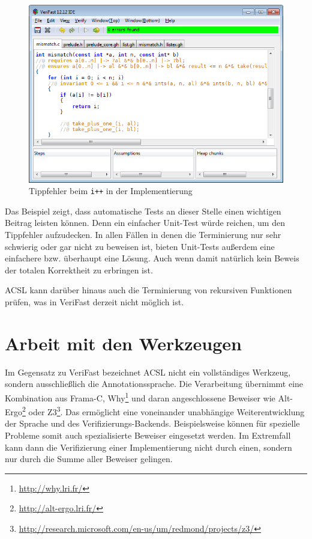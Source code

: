 {\begin{figure}[H]
	\centering
\includegraphics[width=1.0\textwidth]{images/VeriFast-partial-correctness.png}
\caption{Tippfehler beim \texttt{i++} in der Implementierung}
\end{figure}

Das Beispiel zeigt, dass automatische Tests an dieser Stelle einen wichtigen Beitrag leisten
können. Denn ein einfacher Unit-Test würde reichen, um den Tippfehler aufzudecken. In allen
Fällen in denen die Terminierung nur sehr schwierig oder gar nicht zu beweisen ist, bieten
Unit-Tests außerdem eine einfachere bzw. überhaupt eine Lösung. Auch wenn damit natürlich
kein Beweis der totalen Korrektheit zu erbringen ist.

ACSL kann darüber hinaus auch die Terminierung von rekursiven Funktionen prüfen, was in
VeriFast derzeit nicht möglich ist.


\section{Arbeit mit den Werkzeugen}
Im Gegensatz zu VeriFast bezeichnet ACSL nicht ein vollständiges Werkzeug, sondern ausschließlich
die Annotationssprache. Die Verarbeitung übernimmt eine Kombination aus Frama-C, Why\footnote{
\url{http://why.lri.fr/}} und daran angeschlossene Beweiser wie Alt-Ergo\footnote{\url{http://alt-ergo.lri.fr/}}
oder Z3\footnote{\url{http://research.microsoft.com/en-us/um/redmond/projects/z3/}}. Das ermöglicht 
eine voneinander unabhängige Weiterentwicklung der Sprache und des Verifizierungs-Backends. Beispielsweise 
können für spezielle Probleme somit auch spezialisierte Beweiser eingesetzt werden. Im Extremfall kann
dann die Verifizierung einer Implementierung nicht durch einen, sondern nur durch die Summe aller
Beweiser gelingen.

}
